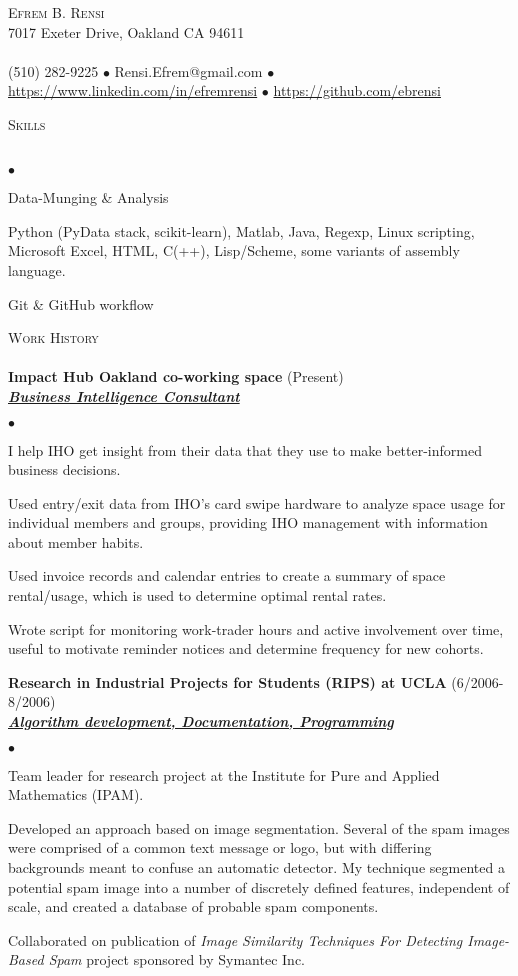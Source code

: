 \documentclass{article}
\newcommand{\lineunder}{\vspace*{-8pt} \\ \hspace*{-18pt} \hrulefill \\}
\newcommand{\header}[1]{{\hspace*{-15pt}\vspace*{6pt} \textsc{#1}} \vspace*{-6pt} \lineunder}
\newcommand{\employer}[3]{{ \textbf{#1} (#2)\\ \underline{\textbf{\emph{#3}}}\\  }}
\newcommand{\contact}[3]{
\vspace*{-8pt}
\begin{center}
{\LARGE \scshape {#1}}\\
#2 \lineunder
#3
\end{center}
\vspace*{-8pt}
}
\newenvironment{achievements}{\begin{list}{$\bullet$}{\topsep 0pt \itemsep -2pt}}{\vspace*{4pt}\end{list}}
\begin{document}
\small
\smallskip
\vspace*{-44pt}

\contact{Efrem B. Rensi}
{7017 Exeter Drive, Oakland CA 94611}
{(510) 282-9225 $\bullet$ Rensi.Efrem@gmail.com  $\bullet$ \url{https://www.linkedin.com/in/efremrensi}
$\bullet$ \url{https://github.com/ebrensi}
}
\bigskip

\medskip
\header{Skills}
\begin{achievements}
\item Data-Munging \& Analysis
\item Python (PyData stack, scikit-learn), Matlab, Java, Regexp, Linux scripting, Microsoft Excel, HTML, C(++), Lisp/Scheme, some variants of assembly language.
\item Git \& GitHub workflow
\end{achievements}
\medskip

\header{Work History}
\employer{Impact Hub Oakland co-working space}{Present}{Business Intelligence Consultant}
\begin{achievements}
\item I help IHO get insight from their data that they use to make better-informed business decisions.
\item Used entry/exit data from IHO's card swipe hardware to analyze space usage for individual members and groups, providing IHO management with information about member habits.
\item Used invoice records and calendar entries to create a summary of space rental/usage, which is used to determine optimal rental rates.
\item Wrote script for monitoring work-trader hours and active involvement over time, useful to motivate reminder notices and determine frequency for new cohorts.
\end{achievements}

\employer{Research in Industrial Projects for Students (RIPS) at UCLA}{6/2006-8/2006}{Algorithm development, Documentation, Programming}
	\begin{achievements}
	\item Team leader for research project at the Institute for Pure and Applied Mathematics (IPAM).
	\item Developed an approach based on image segmentation. Several of the spam images were comprised of a common text message or logo, but with differing backgrounds meant to confuse an automatic detector. My technique segmented a potential spam image into a number of discretely defined features, independent of scale, and created a database of probable spam components.
	\item Collaborated on publication of \emph{Image Similarity Techniques For Detecting Image-Based Spam} project sponsored by Symantec Inc.

	\end{achievements}
\end{document}

